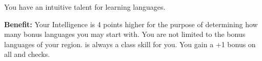 
You have an intuitive talent for learning languages.

\textbf{Benefit:} Your Intelligence is 4 points higher for the purpose of determining how many bonus languages you may start with. You are not limited to the bonus languages of your region.  is always a class skill for you. You gain a +1 bonus on all  and  checks.